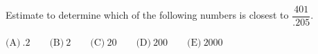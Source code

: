 Estimate to determine which of the following numbers is closest to $\dfrac{401}{.205}$.



$\text{(A)}\ .2 \qquad \text{(B)}\ 2 \qquad \text{(C)}\ 20 \qquad \text{(D)}\ 200 \qquad \text{(E)}\ 2000$
